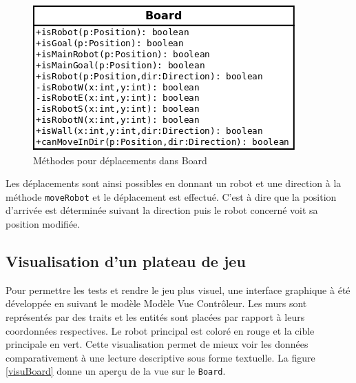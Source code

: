 \documentclass[a4paper]{article} %
\begin{document}
\begin{figure}[htpb]
	\begin{center}
	\includegraphics[scale=0.5]{./images/boardMove.png}
	\caption{Méthodes pour déplacements dans Board}
	\end{center}
\end{figure}

Les déplacements sont ainsi possibles en donnant un robot et une direction à la méthode \texttt{moveRobot} et le déplacement est effectué. C'est à dire que la position d'arrivée est déterminée suivant la direction puis le robot concerné voit sa position modifiée.

	\subsection{Visualisation d'un plateau de jeu}
Pour permettre les tests et rendre le jeu plus visuel, une interface graphique à été développée en suivant le modèle Modèle Vue Contrôleur. Les murs sont représentés par des traits et les entités sont placées par rapport à leurs coordonnées respectives. Le robot principal est coloré en rouge et la cible principale en vert. Cette visualisation permet de mieux voir les données comparativement à une lecture descriptive sous forme textuelle.
La figure \ref{visuBoard} donne un aperçu de la vue sur le \texttt{Board}.
\end{document}
